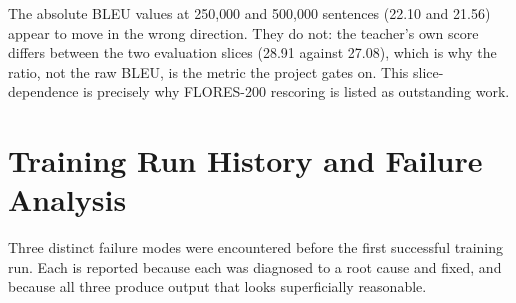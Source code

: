 The absolute BLEU values at 250{,}000 and 500{,}000 sentences (22.10 and 21.56)
appear to move in the wrong direction. They do not: the teacher's own score
differs between the two evaluation slices (28.91 against 27.08), which is why
the ratio, not the raw BLEU, is the metric the project gates on. This
slice-dependence is precisely why FLORES-200 rescoring is listed as outstanding
work.

\section{Training Run History and Failure Analysis}
\label{sec:runlog}

Three distinct failure modes were encountered before the first successful
training run. Each is reported because each was diagnosed to a root cause and
fixed, and because all three produce output that looks superficially reasonable.

